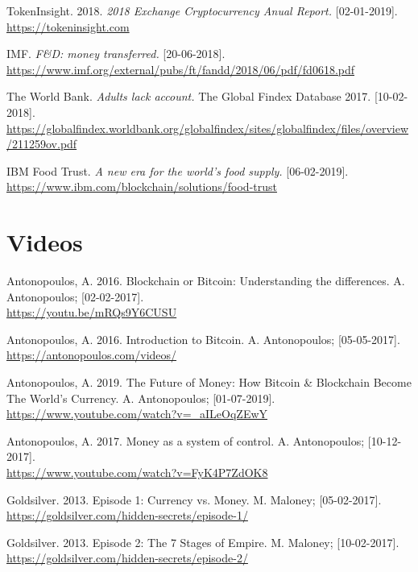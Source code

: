 \begin{thebibliography}{25}
TokenInsight. 2018. \textit{2018 Exchange Cryptocurrency Anual Report.} [02-01-2019].\\
\url{https://tokeninsight.com}

IMF. \emph{F\&D: money transferred.}  [20-06-2018].\\ \url{https://www.imf.org/external/pubs/ft/fandd/2018/06/pdf/fd0618.pdf}

The World Bank. \emph{Adults lack account.} The Global Findex Database 2017. [10-02-2018].\\
\url{https://globalfindex.worldbank.org/globalfindex/sites/globalfindex/files/overview/211259ov.pdf}

IBM Food Trust. \emph{A new era for the world's food supply.}  [06-02-2019].\\
\url{https://www.ibm.com/blockchain/solutions/food-trust}


 \section*{Videos}

Antonopoulos, A. 2016. Blockchain or Bitcoin: Understanding the differences.
A. Antonopoulos; [02-02-2017].\\ 
\url{https://youtu.be/mRQs9Y6CUSU}
 
Antonopoulos, A. 2016. Introduction to Bitcoin.
A. Antonopoulos; [05-05-2017].\\
\url{https://antonopoulos.com/videos/}

Antonopoulos, A. 2019. The Future of Money: How Bitcoin \& Blockchain Become The World's Currency.
A. Antonopoulos; [01-07-2019].\\
\url{https://www.youtube.com/watch?v=_aILeOqZEwY} 

 Antonopoulos, A. 2017. Money as a system of control. A. Antonopoulos; [10-12-2017].\\ \url{https://www.youtube.com/watch?v=FyK4P7ZdOK8}
 
Goldsilver. 2013. Episode 1: Currency vs. Money.
M. Maloney; [05-02-2017].\\
\url{https://goldsilver.com/hidden-secrets/episode-1/}
 
Goldsilver. 2013. Episode 2: The 7 Stages of Empire.
M. Maloney; [10-02-2017].\\ \url{https://goldsilver.com/hidden-secrets/episode-2/}


\end{thebibliography}
